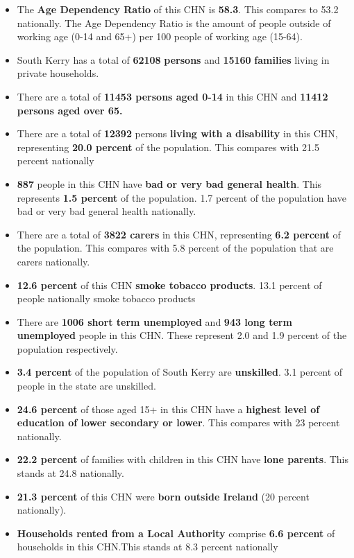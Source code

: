 \documentclass{article}
\begin{document}
\begin{itemize}

\item The \textbf{Age Dependency Ratio} of this CHN is  \textbf{58.3}. This compares to 53.2 nationally. The Age Dependency Ratio is the amount of people outside of working age (0-14 and 65+) per 100 people of working age (15-64). 

\item South Kerry has a total of \textbf{\num{62108}} \textbf{persons} and  \textbf{\num{15160}} \textbf{families} living in private households.

\item There are a total of \textbf{\num{11453} persons aged 0-14} in this CHN and \textbf{\num{11412} persons aged over 65.} 

\item There are a total of \textbf{\num{12392}} persons \textbf{living with a disability} in this CHN, representing \textbf{20.0 percent} of the population. This compares with  21.5 percent nationally

\item \textbf{\num{887}} people in this CHN have \textbf{bad or very bad general health}. This represents \textbf{1.5 percent} of the population. 1.7 percent of the population have bad or very bad general health nationally. 

\item There are a total of \textbf{\num{3822} carers} in this CHN, representing \textbf{6.2 percent} of the population. This compares with 5.8 percent of the population that are carers nationally. 

\item \textbf{12.6 percent} of this CHN \textbf{smoke tobacco products}. 13.1 percent of people nationally smoke tobacco products

\item There are \textbf{\num{1006} short term unemployed} and \textbf{\num{943} long term unemployed} people in this CHN. These represent 2.0 and 1.9 percent of the population respectively.

\item  \textbf{3.4 percent} of the population of South Kerry are \textbf{unskilled}. 3.1 percent of people in the state are unskilled.

\item \textbf{24.6 percent} of those aged 15+ in this CHN have a \textbf{highest level of education of lower secondary or lower}. This compares with 23 percent nationally. 

\item \textbf{22.2 percent} of families with children in this CHN have \textbf{lone parents}. This stands at 24.8 nationally.

\item \textbf{21.3 percent} of this CHN were \textbf{born outside Ireland} (20 percent nationally).

\item \textbf{Households rented from a Local Authority} comprise \textbf{6.6 percent} of households in this CHN.This stands at 8.3 percent nationally

\end{itemize}
\end{document}
